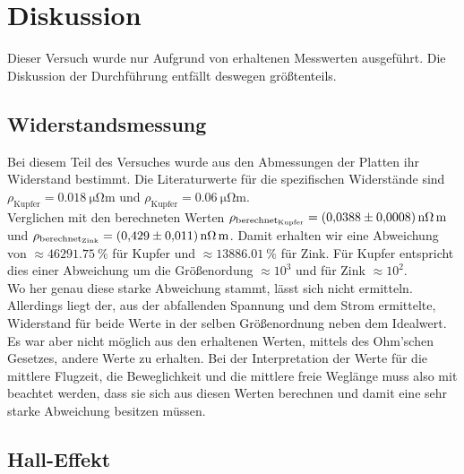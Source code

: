 \section{Diskussion}
Dieser Versuch wurde nur Aufgrund von erhaltenen Messwerten ausgeführt. Die Diskussion der Durchführung entfällt deswegen größtenteils.
\subsection{Widerstandsmessung}
Bei diesem Teil des Versuches wurde aus den Abmessungen der Platten ihr Widerstand bestimmt. Die Literaturwerte für die spezifischen Widerstände \cite{Widerstand}
sind $\rho_\text{Kupfer}=\SI{0.018}{\micro\ohm\metre}$ und $\rho_\text{Kupfer}=\SI{0.06}{\micro\ohm\metre}$.\\
Verglichen mit den berechneten Werten $\rho_\text{berechnet$_\text{Kupfer}$} = \SI{0.0388+-0.0008}{\nano\ohm\meter}$ und 
$\rho_\text{berechnet$_\text{Zink}$} = \SI{0.429+-0.011}{\nano\ohm\meter}$. Damit erhalten wir eine Abweichung von $\approx \SI{46291.75}{\percent}$ für Kupfer und 
$\approx \SI{13886.01}{\percent}$ für Zink. Für Kupfer entspricht dies einer Abweichung um die Größenordung $\approx 10^3$ und für Zink $\approx 10^2$.\\
Wo her genau diese starke Abweichung stammt, lässt sich nicht ermitteln.\\
Allerdings liegt der, aus der abfallenden Spannung und dem Strom ermittelte, Widerstand für beide Werte in der selben Größenordnung neben dem Idealwert.
Es war aber nicht möglich aus den erhaltenen Werten, mittels des Ohm'schen Gesetzes, andere Werte zu erhalten.  
Bei der Interpretation der Werte für die mittlere Flugzeit, die Beweglichkeit und die mittlere freie Weglänge muss also mit beachtet werden, dass sie sich aus diesen Werten berechnen und damit 
eine sehr starke Abweichung besitzen müssen.

\subsection{Hall-Effekt}